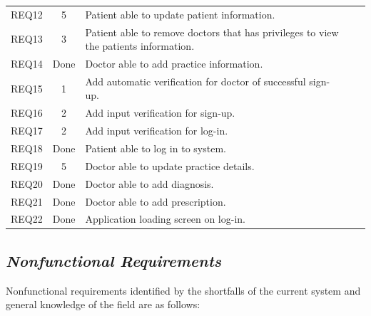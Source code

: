 \documentclass[a4paper]{article}
\begin{document}
\begin{table}[h!]
\begin{tabular}{lllll}
\multicolumn{1}{|c|}{REQ12} & \multicolumn{1}{c|}{5} & \multicolumn{1}{l|}{Patient able to update patient information.} &  &  \\

\multicolumn{1}{|c|}{REQ13} & \multicolumn{1}{c|}{3} & \multicolumn{1}{l|}{Patient able to remove doctors that has privileges to view the patients information.} &  &  \\

\multicolumn{1}{|c|}{REQ14} & \multicolumn{1}{c|}{Done} & \multicolumn{1}{l|}{Doctor able to add practice information.} &  &  \\

\multicolumn{1}{|c|}{REQ15} & \multicolumn{1}{c|}{1} & \multicolumn{1}{l|}{Add automatic verification for doctor of successful sign-up.} &  &  \\ 

\multicolumn{1}{|c|}{REQ16} & \multicolumn{1}{c|}{2} & \multicolumn{1}{l|}{Add input verification for sign-up.} &  &  \\

\multicolumn{1}{|c|}{REQ17} & \multicolumn{1}{c|}{2} & \multicolumn{1}{l|}{Add input verification for log-in.} &  &  \\ 

\multicolumn{1}{|c|}{REQ18} & \multicolumn{1}{c|}{Done} & \multicolumn{1}{l|}{Patient able to log in to system.} &  &  \\ 

\multicolumn{1}{|c|}{REQ19} & \multicolumn{1}{c|}{5} & \multicolumn{1}{l|}{Doctor able to update practice details.} &  &  \\ 

\multicolumn{1}{|c|}{REQ20} & \multicolumn{1}{c|}{Done} & \multicolumn{1}{l|}{Doctor able to add diagnosis.} &  &  \\

\multicolumn{1}{|c|}{REQ21} & \multicolumn{1}{c|}{Done} & \multicolumn{1}{l|}{Doctor able to add prescription.} &  &  \\

\multicolumn{1}{|c|}{REQ22} & \multicolumn{1}{c|}{Done} & \multicolumn{1}{l|}{Application loading screen on log-in.} &  &  \\ \cline{1-3}

\end{tabular}
\end{table}

\FloatBarrier
		
\subsection{\textit{Nonfunctional Requirements}}
Nonfunctional requirements identified by the shortfalls of the current system and general knowledge of the field are as follows:
\end{document}
